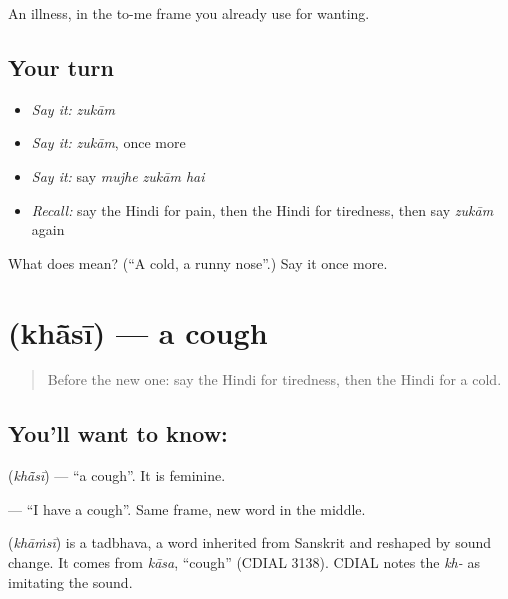 \begin{grammarlens}[title={What you've built}]
An illness, in the to-me frame you already use for wanting.
\end{grammarlens}

\subsection*{Your turn}
\begin{itemize}
\raggedright
  \item \emph{Say it:} \emph{zukām}
  \item \emph{Say it:} \emph{zukām}, once more
  \item \emph{Say it:} say \emph{mujhe zukām hai}
  \item \emph{Recall:} say the Hindi for pain, then the Hindi for tiredness, then say \emph{zukām} again
\end{itemize}

\begin{tcolorbox}[breakable,colback=teal!4,colframe=teal!35!black,title={Before you move on}]
What does  mean? (\textquotedblleft{}A cold, a runny nose\textquotedblright{}.) Say it once more.
\end{tcolorbox}
\section[\texorpdfstring{\hi{खाँसी} (khā̃sī)}{खाँसी (khā̃sī)}]{ (khā̃sī) — a cough}

\label{lesson:HI-C106-khansi}



\begin{quote}
Before the new one: say the Hindi for tiredness, then the Hindi for a cold.
\end{quote}

\subsection*{You'll want to know: }
\textbf{} (\emph{khā̃sī}) — \textquotedblleft{}a cough\textquotedblright{}. It is feminine.

\textbf{  } — \textquotedblleft{}I have a cough\textquotedblright{}. Same frame, new word in the middle.

\begin{cousinweb}
\textbf{} (\emph{khāṁsī}) is a tadbhava, a word inherited from Sanskrit and reshaped by sound change. It comes from \emph{kāsa}, \textquotedblleft{}cough\textquotedblright{} (CDIAL 3138). CDIAL notes the \emph{kh-} as imitating the sound.
\end{cousinweb}

